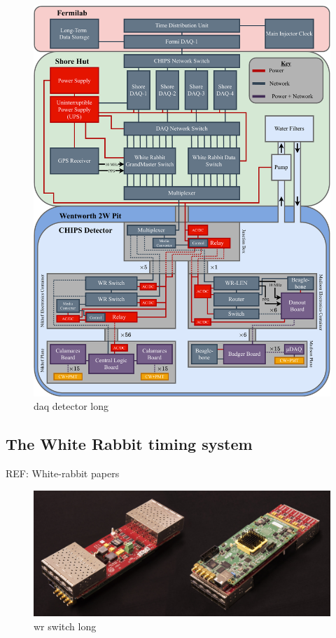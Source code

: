 \begin{figure} %
    \includegraphics[width=\textwidth]{diagrams/5-daq/daq_detector.pdf}
    \caption[daq detector short]
    {daq detector long}
    \label{fig:daq_detector}
\end{figure}

\subsection{The White Rabbit timing system} %
\label{sec:daq_hard_timing} %

REF: White-rabbit papers

\begin{figure} %
    \includegraphics[width=\textwidth]{diagrams/5-daq/wr_switch.jpg}
    \caption[wr switch short]
    {wr switch long}
    \label{fig:wr_switch}
\end{figure}

